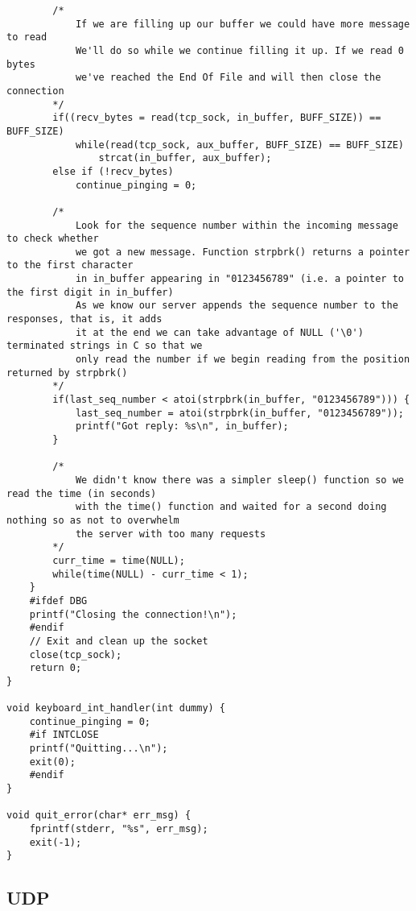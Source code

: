 \documentclass[landscape]{article}
\begin{document}
\begin{verbatim}
        /*
            If we are filling up our buffer we could have more message to read
            We'll do so while we continue filling it up. If we read 0 bytes
            we've reached the End Of File and will then close the connection
        */
        if((recv_bytes = read(tcp_sock, in_buffer, BUFF_SIZE)) == BUFF_SIZE)
            while(read(tcp_sock, aux_buffer, BUFF_SIZE) == BUFF_SIZE)
                strcat(in_buffer, aux_buffer);
        else if (!recv_bytes)
            continue_pinging = 0;

        /*
            Look for the sequence number within the incoming message to check whether
            we got a new message. Function strpbrk() returns a pointer to the first character
            in in_buffer appearing in "0123456789" (i.e. a pointer to the first digit in in_buffer)
            As we know our server appends the sequence number to the responses, that is, it adds
            it at the end we can take advantage of NULL ('\0') terminated strings in C so that we
            only read the number if we begin reading from the position returned by strpbrk() 
        */
        if(last_seq_number < atoi(strpbrk(in_buffer, "0123456789"))) {
            last_seq_number = atoi(strpbrk(in_buffer, "0123456789"));
            printf("Got reply: %s\n", in_buffer);
        }

        /*
            We didn't know there was a simpler sleep() function so we read the time (in seconds)
            with the time() function and waited for a second doing nothing so as not to overwhelm
            the server with too many requests
        */
        curr_time = time(NULL);
        while(time(NULL) - curr_time < 1);
    }
    #ifdef DBG
    printf("Closing the connection!\n");
    #endif
    // Exit and clean up the socket
    close(tcp_sock);
    return 0;
}

void keyboard_int_handler(int dummy) {
    continue_pinging = 0;
    #if INTCLOSE
    printf("Quitting...\n");
    exit(0);
    #endif
}

void quit_error(char* err_msg) {
    fprintf(stderr, "%s", err_msg);
    exit(-1);
}
                \end{verbatim}
        \subsection{UDP}
\end{document}

